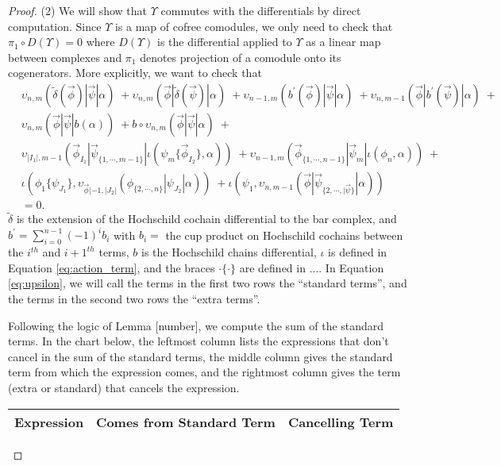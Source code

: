 \begin{proof}
(2) We will show that $\Upsilon$ commutes with 
the differentials by direct computation. Since 
$\Upsilon$ is a map of cofree comodules, we only 
need to check that $\pi_1 \circ D(\Upsilon) = 0$ 
where $D(\Upsilon)$ is the differential applied 
to $\Upsilon$ as a linear map between complexes 
and $\pi_1$ denotes projection of a comodule 
onto its cogenerators. More explicitly, we want 
to check that
\begin{equation} \label{eq:upsilon}
\begin{aligned}
&\upsilon_{n, m} ( \tilde{\delta}(\vec{\phi}) | \vec{\psi} | \alpha ) \; + 
\upsilon_{n, m} ( \vec{\phi} | \tilde{\delta}(\vec{\psi}) | \alpha ) \; + 
\upsilon_{n-1, m} ( b^\prime(\vec{\phi}) | \vec{\psi} | \alpha ) \; + 
\upsilon_{n, m-1} ( \vec{\phi} | b^\prime(\vec{\psi}) | \alpha ) \; + \\
&\upsilon_{n, m} ( \vec{\phi} | \vec{\psi} | b(\alpha) ) \; + 
b \circ \upsilon_{n, m} ( \vec{\phi} | \vec{\psi} | \alpha ) \; + \\
&\upsilon_{|I_1|, m-1}(\vec{\phi}_{I_1} | \vec{\psi}_{\{1,\cdots, m-1\}} | \iota(\psi_{m} \{\vec{\phi}_{I_2}\}, \alpha )) \; + 
\upsilon_{n-1, m}(\vec{\phi}_{\{1,\cdots, n-1\}} |\vec{\psi}_{m} | \iota(\phi_{n},\alpha)) \; + \\
&\iota(\phi_1 \{ \psi_{J_1}\}, \upsilon_{\vec{\phi}|-1, |J_2|}(\phi_{\{2,\cdots , n\}} | \psi_{J_2} | \alpha )) \; + 
\iota(\psi_1, \upsilon_{n,m-1} ( \vec{\phi} | \vec{\psi}_{\{2,\cdots, |\vec{\psi}\}} | \alpha)) \\ 
&= 0.
\end{aligned}
\end{equation}
$\tilde{\delta}$ is the extension of the Hochschild 
cochain differential to the bar complex, 
and $b^\prime = \sum_{i=0}^{n-1} (-1)^{i}b_i$ with
$b_i =$ the cup product on Hochschild cochains 
between the $i^{th}$ and $i+1^{th}$ terms, $b$ is 
the Hochschild chains differential, $\iota$ is 
defined in Equation \ref{eq:action_term}, and 
the braces $\cdot \{ \cdot \}$ are defined in ....
In Equation \ref{eq:upsilon}, we will call the 
terms in the first two rows the ``standard terms'', 
and the terms in the second two rows the 
``extra terms''.

Following the logic of Lemma [number], we compute the sum of the standard terms. In the chart below, the leftmost column lists the expressions that don't cancel in the sum of the standard terms, the middle column gives the standard term from which the expression comes, and the rightmost column gives the term (extra or standard) that cancels the expression. 
\newpage
\begin{landscape}
\begin{center}
  \begin{tabular}{ p{3.25in} | p{2in} | p{2.5in} }
    \hline
    Expression & Comes from Standard Term & Cancelling Term \\ \hline
    

\end{tabular}
\end{center}
\end{landscape}
\end{proof}
